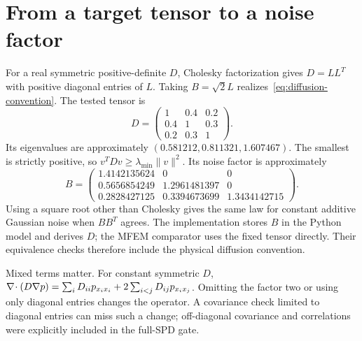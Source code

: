 \section{From a target tensor to a noise factor}
For a real symmetric positive-definite $D$, Cholesky factorization gives $D=LL^T$ with positive diagonal entries of $L$. Taking $B=\sqrt2L$ realizes~\eqref{eq:diffusion-convention}. The tested tensor is
\begin{equation}\label{eq:spd-tensor}
D=\begin{pmatrix}1&0.4&0.2\\0.4&1&0.3\\0.2&0.3&1\end{pmatrix}.
\end{equation}
Its eigenvalues are approximately $(0.581212,0.811321,1.607467)$. The smallest is strictly positive, so $v^TDv\ge\lambda_{\min}\|v\|^2$. Its noise factor is approximately
\begin{equation}
B=\begin{pmatrix}1.4142135624&0&0\\0.5656854249&1.2961481397&0\\0.2828427125&0.3394673699&1.3434142715\end{pmatrix}.
\end{equation}
Using a square root other than Cholesky gives the same law for constant additive Gaussian noise when $BB^T$ agrees. The implementation stores $B$ in the Python model and derives $D$; the MFEM comparator uses the fixed tensor directly. Their equivalence checks therefore include the physical diffusion convention.

Mixed terms matter. For constant symmetric $D$, $\nabla\!\cdot(D\nabla p)=\sum_iD_{ii}p_{x_ix_i}+2\sum_{i<j}D_{ij}p_{x_ix_j}$. Omitting the factor two or using only diagonal entries changes the operator. A covariance check limited to diagonal entries can miss such a change; off-diagonal covariance and correlations were explicitly included in the full-SPD gate.

